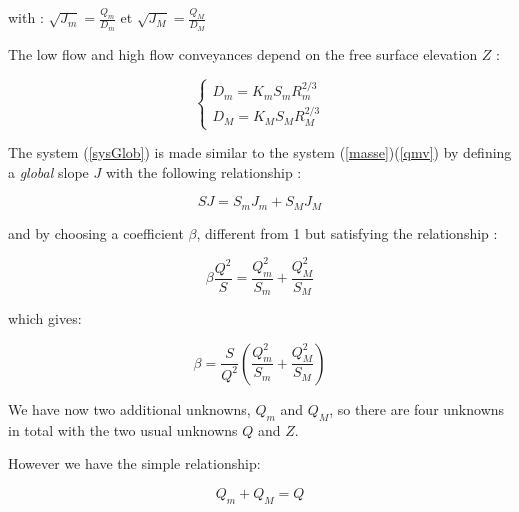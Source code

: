 with : $\sqrt{J_m} = \frac{Q_m}{D_m}$ et  $\sqrt{J_M} = \frac{Q_M}{D_M}$

\vspace{0.5cm}

The low flow and high flow conveyances depend on the free surface elevation $Z$ :

\begin{equation}
 \left \lbrace
  \begin{array}{l}
    D_m = K_m S_m R_{m}^{2/3} \\
    D_M = K_M S_M R_{M}^{2/3}
  \end{array}
 \right.
\end{equation}

\vspace{0.5cm}

The system (\ref{sysGlob}) is made similar to the system (\ref{masse})(\ref{qmv}) by defining a \textit{global} slope $J$ with the following relationship :

\begin{equation}
  SJ = S_m J_m + S_M J_M
\end{equation}

\vspace{0.5cm}

and by choosing a coefficient $\beta$, different from 1 but satisfying the relationship :

\begin{equation}
  \beta \frac{Q^2}{S} = \frac{Q_{m}^2}{S_m} + \frac{Q_{M}^2}{S_M}
\end{equation}

which gives:

\begin{equation}
  \beta =  \frac{S}{Q^2} \left ( \frac{Q_{m}^2}{S_m} + \frac{Q_{M}^2}{S_M} \right )
\end{equation}

\vspace{0.5cm}

We have now two additional unknowns, $Q_m$ and $Q_M$, so there are four unknowns in total with the two usual unknowns $Q$ and $Z$.

\vspace{0.5cm}

However we have the simple relationship:

\begin{equation}
  Q_m + Q_M = Q
\end{equation}

\vspace{0.5cm}

